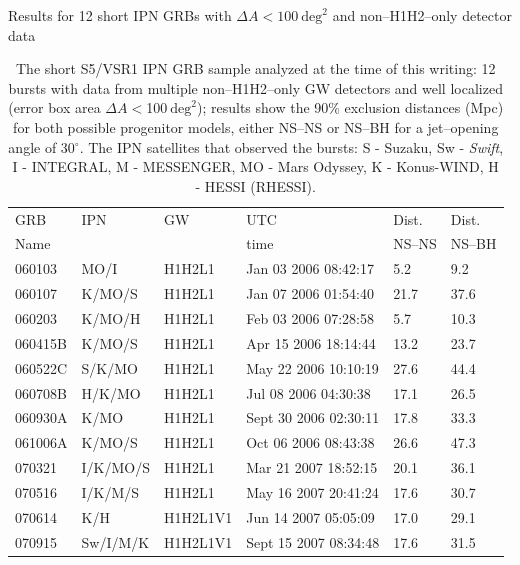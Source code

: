 \begin{table}[htb]
\begin{center}

Results for 12 short IPN GRBs with $\Delta A < 100 ~\mathrm{deg}^2$ and non--H1H2--only detector data

\begin{tabular}{*{6}{l}}
\hline
GRB&IPN&GW&UTC&Dist.&Dist.\\
Name&&&time&NS--NS&NS--BH\\
\hline
060103&MO/I &H1H2L1&Jan 03 2006 08:42:17& 5.2 & 9.2 \\
060107&K/MO/S&H1H2L1&Jan 07 2006 01:54:40& 21.7 & 37.6 \\
060203&K/MO/H&H1H2L1&Feb 03 2006 07:28:58& 5.7 & 10.3 \\ 
060415B&K/MO/S&H1H2L1&Apr 15 2006 18:14:44& 13.2 & 23.7\\
060522C&S/K/MO&H1H2L1&May 22 2006 10:10:19& 27.6 & 44.4\\ 
060708B&H/K/MO&H1H2L1&Jul 08 2006 04:30:38& 17.1 & 26.5 \\
060930A&K/MO&H1H2L1&Sept 30 2006 02:30:11& 17.8 & 33.3\\
061006A&K/MO/S&H1H2L1&Oct 06 2006 08:43:38& 26.6 & 47.3 \\
070321&I/K/MO/S&H1H2L1&Mar 21 2007 18:52:15& 20.1 & 36.1 \\
070516&I/K/M/S&H1H2L1&May 16 2007 20:41:24& 17.6 & 30.7 \\
070614&K/H&H1H2L1V1&Jun 14 2007 05:05:09& 17.0 & 29.1 \\ 
070915&Sw/I/M/K&H1H2L1V1&Sept 15 2007 08:34:48& 17.6 & 31.5 \\
\hline
\end{tabular}
\caption{\label{tab:shortGRB} The short S5/VSR1 IPN GRB sample analyzed at the time of this writing: 12 bursts with data from multiple non--H1H2--only GW detectors and well localized (error box area $\Delta A <$100$~\mathrm{deg}^2$); results show the 90\% exclusion distances (Mpc) for both possible progenitor models, either NS--NS or NS--BH for a jet--opening angle of 30$^\circ$. The IPN satellites that observed the bursts: S - Suzaku, Sw - \emph{Swift}, I - INTEGRAL, M - MESSENGER, MO - Mars Odyssey, K - Konus-WIND, H - HESSI (RHESSI).}
\end{center}
\label{tab:ipn_grb_results}
\end{table}

